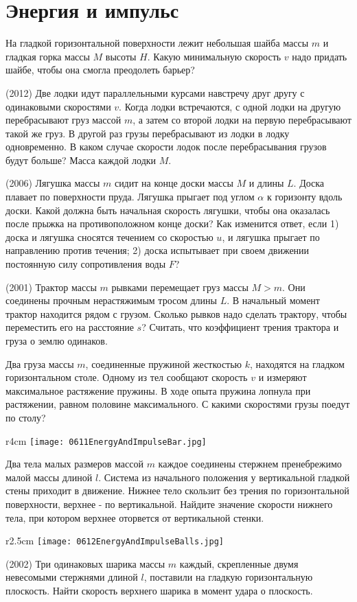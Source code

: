 \section{Энергия и импульс}
\AddProb На гладкой горизонтальной поверхности лежит небольшая шайба массы $m$ и гладкая горка массы $M$ высоты $H$. 
Какую минимальную скорость $v$ надо придать шайбе, чтобы она смогла преодолеть барьер?

\AddProb (2012) Две лодки идут параллельными курсами навстречу друг другу с одинаковыми скоростями $v$. 
Когда лодки встречаются, с одной лодки на другую перебрасывают груз массой $m$, а затем со второй лодки на первую перебрасывают такой же груз. 
В другой раз грузы перебрасывают из лодки в лодку одновременно. В каком случае скорости лодок после перебрасывания грузов будут больше? 
Масса каждой лодки $M$.

\AddProb (2006) Лягушка массы $m$ сидит на конце доски массы $M$ и длины $L$. Доска плавает по поверхности пруда. 
Лягушка прыгает под углом $\alpha$ к горизонту вдоль доски. Какой должна быть начальная скорость лягушки, 
чтобы она оказалась после прыжка на противоположном конце доски? Как изменится ответ, если 1) доска и лягушка сносятся течением со скоростью $u$,
 и лягушка прыгает по направлению против течения; 2) доска испытывает при своем движении постоянную силу сопротивления воды $F$?

\AddProb (2001) Трактор массы $m$ рывками перемещает груз массы $M>m$. Они соединены прочным нерастяжимым тросом длины $L$. 
В начальный момент трактор находится рядом с грузом. Сколько рывков надо сделать трактору, чтобы переместить его на расстояние $s$? 
Считать, что коэффициент трения трактора и груза о землю одинаков.

\AddProb Два груза массы $m$, соединенные пружиной жесткостью $k$, находятся на гладком горизонтальном столе. 
Одному из тел сообщают скорость $v$ и измеряют максимальное растяжение пружины. 
В ходе опыта пружина лопнула при растяжении, равном половине максимального. С какими скоростями грузы поедут по столу?

\begin{wrapfigure}{r}{4cm}
\texttt{[image: 0611EnergyAndImpulseBar.jpg]}
\end{wrapfigure}

\AddProb Два тела малых размеров массой $m$ каждое соединены стержнем пренебрежимо малой массы длиной $l$. 
Система из начального положения у вертикальной гладкой стены приходит в движение. 
Нижнее тело скользит без трения по горизонтальной поверхности, верхнее - по вертикальной. 
Найдите значение скорости нижнего тела, при котором верхнее оторвется от вертикальной стенки.

\begin{wrapfigure}{r}{2.5cm}
\texttt{[image: 0612EnergyAndImpulseBalls.jpg]}
\end{wrapfigure}

\AddProb (2002) Три одинаковых шарика массы $m$ каждый, скрепленные двумя невесомыми стержнями длиной $l$, 
поставили на гладкую горизонтальную плоскость. Найти скорость верхнего шарика в момент удара о плоскость.
